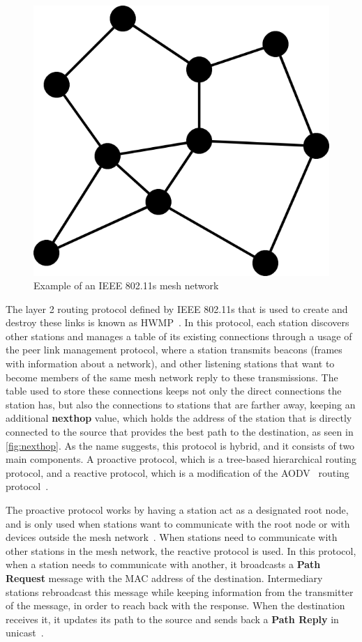 \begin{figure}[htb]
   \centering
   \includegraphics[scale=.4]{meshnet}
   \caption{Example of an \ac{IEEE} 802.11s mesh network}\label{fig:meshnet}
\end{figure}

The layer 2 routing protocol defined by \ac{IEEE} 802.11s that is used to create
and destroy these links is known as \ac{HWMP}~\cite{ieee80211}. In this
protocol, each station discovers other stations and manages a table of its
existing connections through a usage of the peer link management protocol, where
a station transmits beacons (frames with information about a network), and other
listening stations that want to become members of the same mesh network reply to
these transmissions. The table used to store these connections keeps not only
the direct connections the station has, but also the connections to stations
that are farther away, keeping an additional \textbf{nexthop} value, which holds
the address of the station that is directly connected to the source that
provides the best path to the destination, as seen in \autoref{fig:nexthop}. As
the name suggests, this protocol is hybrid, and it consists of two main
components. A proactive protocol, which is a tree-based hierarchical routing
protocol, and a reactive protocol, which is a modification of the
\ac{AODV}~\cite{aodv} routing protocol~\cite{ieee80211s}.

The proactive protocol works by having a station act as a designated root node,
and is only used when stations want to communicate with the root node or with
devices outside the mesh network~\cite{hwmpproa,hwmpperf}. When stations need to
communicate with other stations in the mesh network, the reactive protocol is
used. In this protocol, when a station needs to communicate with another, it
broadcasts a \textbf{Path Request} message with the \ac{MAC} address of the
destination. Intermediary stations rebroadcast this message while keeping
information from the transmitter of the message, in order to reach back with the
response. When the destination receives it, it updates its path to the source
and sends back a \textbf{Path Reply} in unicast~\cite{hwmpperf}.

